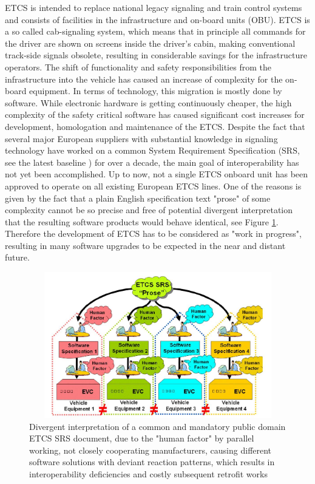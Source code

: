 \documentclass{template/openetcs_report}
\begin{document}
ETCS is intended to replace national legacy signaling and train control systems and consists of facilities in the infrastructure and on-board units (OBU). ETCS is a so called cab-signaling system, which means that in principle all commands for the driver are shown on screens inside the driver's cabin, making conventional track-side signals obsolete, resulting in considerable savings for the infrastructure operators. The shift of functionality and safety responsibilities from the infrastructure into the vehicle has caused an increase of complexity for the on-board equipment. In terms of technology, this migration is mostly done by software. While electronic hardware is getting continuously cheaper, the high complexity of the safety critical software has caused significant cost increases for development, homologation and maintenance of the ETCS.
Despite the fact that several major European suppliers with substantial knowledge in signaling technology have worked on a common System Requirement Specification (SRS, see the latest baseline \cite{SRS-doc} ) for over a decade, the main goal of interoperability has not yet been accomplished. Up to now, not a single ETCS onboard unit has been approved to operate on all existing European ETCS lines. One of the reasons is given by the fact that a plain English specification text "prose" of some complexity cannot be so precise and free of potential divergent interpretation that the resulting software products would behave identical, see Figure \ref{fig:openETCS3}. Therefore the development of ETCS has to be considered as "work in progress", resulting in many software upgrades to be expected in the near and distant future.



\begin{figure}[h]
\centering
\includegraphics[width=1.0\textwidth, height=240px]{openETCS3}
\caption{Divergent interpretation of a common and mandatory public domain ETCS SRS document, due to the "human factor" by parallel working, not closely cooperating manufacturers, causing different software solutions with deviant reaction patterns, which results in interoperability deficiencies and costly subsequent retrofit works}
\label{fig:openETCS3}
\end{figure}
\end{document}
